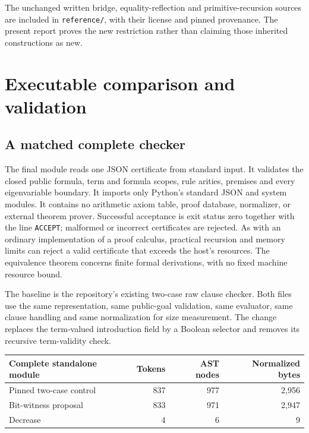 \documentclass[11pt,letterpaper]{article}
\theoremstyle{definition}
\theoremstyle{remark}
\begin{document}
The unchanged written bridge, equality-reflection and primitive-recursion
sources are included in \texttt{reference/}, with their license and
pinned provenance. The present report proves the new restriction rather
than claiming those inherited constructions as new.

\section{Executable comparison and validation}
\label{sec:implementation}

\subsection{A matched complete checker}

The final module reads one JSON certificate from standard input. It
validates the closed public formula, term and formula scopes, rule
arities, premises and every eigenvariable boundary. It imports only
Python's standard JSON and system modules. It contains no arithmetic
axiom table, proof database, normalizer, or external theorem prover.
Successful acceptance is exit status zero together with the line
\texttt{ACCEPT}; malformed or incorrect certificates are rejected.
As with an ordinary implementation of a proof calculus, practical
recursion and memory limits can reject a valid certificate that exceeds
the host's resources. The equivalence theorem concerns finite formal
derivations, with no fixed machine resource bound.

The baseline is the repository's existing two-case raw clause checker.
Both files use the same representation, same public-goal validation,
same evaluator, same clause handling and same normalization for size
measurement. The change replaces the term-valued introduction field by
a Boolean selector and removes its recursive term-validity check.

\begin{center}
\begin{tabular}{lrrr}
\toprule
Complete standalone module & Tokens & AST nodes & Normalized bytes\\
\midrule
Pinned two-case control & 837 & 977 & 2,956\\
Bit-witness proposal & 833 & 971 & 2,947\\
Decrease & 4 & 6 & 9\\
\bottomrule
\end{tabular}
\end{center}
\end{document}
